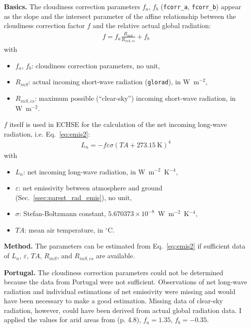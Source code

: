 \documentclass{scrreprt}
\newenvironment{denseitem}{
  \begin{itemize}
    \setlength{\itemsep}{0pt}
    \setlength{\parskip}{0pt}
    \setlength{\parsep}{0pt}
}{
  \end{itemize}
}
\begin{document}
\textbf{Basics.}
The cloudiness correction parameters $f_a$, $f_b$ (\verb!fcorr_a!, \verb!fcorr_b!) appear as the slope and the intersect parameter of the affine relationship between the cloudiness correction factor $f$ and the relative actual global radiation:
\begin{align} \label{eq:fcorr1}
  f = f_a \frac{R_{inS}}{R_{inS,cs}} + f_b
\end{align}
%
with
\begin{denseitem}
  \item[] $f_a$, $f_b$: cloudiness correction parameters, no unit,
  \item[] $R_{inS}$: actual incoming short-wave radiation (\verb!glorad!), in W~m$^{-2}$,
  \item[] $R_{inS,cs}$: maximum possible (``clear-sky'') incoming short-wave radiation, in W~m$^{-2}$.
\end{denseitem}
%
$f$ itself is used in ECHSE for the calculation of the net incoming long-wave radiation, i.e. Eq.~\eqref{eq:emis2}:
\begin{align*}
  L_n = -f \varepsilon \sigma (TA + 273.15~\text{K})^4
\end{align*}
%
with
\begin{denseitem}
  \item[] $L_n$: net incoming long-wave radiation, in W~m$^{-2}$~K$^{-4}$,
  \item[] $\varepsilon$: net emissivity between atmosphere and ground (Sec.~\ref{ssec:parest_rad_emis}), no unit,
  \item[] $\sigma$: Stefan-Boltzmann constant, $5.670373 \times 10^{-8}$~W~m$^{-2}$~K$^{-4}$,
  \item[] $TA$: mean air temperature, in $^\circ$C.
\end{denseitem}

\textbf{Method.}
The parameters can be estimated from Eq.~\eqref{eq:emis2} if sufficient data of $L_n$, $\varepsilon$, $TA$, $R_{inS}$, and $R_{inS,cs}$ are available.

\textbf{Portugal.}
The cloudiness correction parameters could not be determined because the data from Portugal were not sufficient.
Observations of net long-wave radiation and individual estimations of net emissivity were missing and would have been necessary to make a good estimation.
Missing data of clear-sky radiation, however, could have been derived from actual global radiation data.
I applied the values for arid areas from \citet{maidment93} (p. 4.8), $f_a = 1.35$, $f_b = -0.35$.
\end{document}
